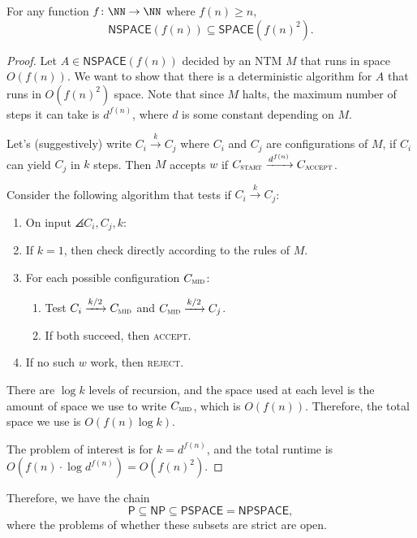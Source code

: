 \documentclass{standalone}
\begin{document}
\begin{theorem}[Savitch]
  For any function \(f \colon \NN \to \NN\) where \(f(n) \geq n\),
  \[
    \mathsf{NSPACE}(f(n)) \subseteq \mathsf{SPACE}(f(n)^2).
  \]
\end{theorem}
\begin{proof}
  Let \(A \in \mathsf{NSPACE}(f(n))\) decided by an \textsf{NTM} \(M\) that runs in space \(O(f(n))\). We want to show that there is a deterministic algorithm for \(A\) that runs in \(O(f(n)^2)\) space. Note that since \(M\) halts, the maximum number of steps it can take is \(d^{f(n)}\), where \(d\) is some constant depending on \(M\).

  Let's (suggestively) write \(C_i \xrightarrow{k} C_j\) where \(C_i\) and \(C_j\) are configurations of \(M\), if \(C_i\) can yield \(C_j\) in \(k\) steps. Then \(M\) accepts \(w\) if \(C_{\textsc{start}} \xrightarrow{d^{f(n)}} C_{\textsc{accept}}\).

  Consider the following algorithm that tests if \(C_i \xrightarrow{k} C_j\):
  \begin{enumerate}[start=0]
    \item On input \(\angles{C_i, C_j, k}\):
    \item If \(k = 1\), then check directly according to the rules of \(M\).
    \item For each possible configuration \(C_{\textsc{mid}}\):
    \begin{enumerate}[nosep]
      \item Test \(C_i \xrightarrow{k/2} C_{\textsc{mid}}\) and \(C_{\textsc{mid}} \xrightarrow{k/2} C_j\).
      \item If both succeed, then \textsc{accept}.
    \end{enumerate}
    \item If no such \(w\) work, then \textsc{reject}.
  \end{enumerate}
  There are \(\log k\) levels of recursion, and the space used at each level is the amount of space we use to write \(C_{\textsc{mid}}\), which is \(O(f(n))\). Therefore, the total space we use is \(O(f(n)\log k)\).

  The problem of interest is for \(k = d^{f(n)}\), and the total runtime is \(O(f(n) \cdot \log d^{f(n)}) = O(f(n)^2)\).
\end{proof}

Therefore, we have the chain
\[
  \mathsf{P} \subseteq \mathsf{NP} \subseteq \mathsf{PSPACE} = \mathsf{NPSPACE},
\]
where the problems of whether these subsets are strict are open.
\end{document}
